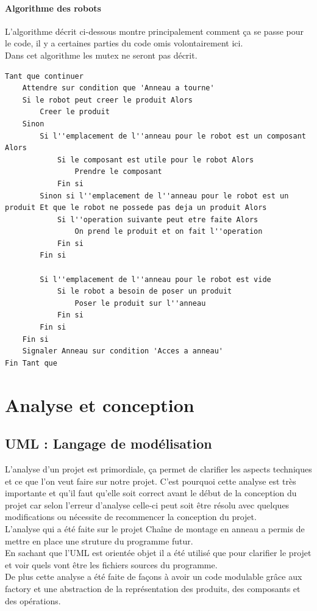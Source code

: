 \documentclass{report}
\begin{document}
\subsubsection{Algorithme des robots}
L'algorithme décrit ci-dessous montre principalement comment ça se passe pour le code, il y a certaines parties du code omis volontairement ici.\\
Dans cet algorithme les mutex ne seront pas décrit.
\begin{lstlisting}[caption=Algorithme des robots simplifié]
Tant que continuer
	Attendre sur condition que 'Anneau a tourne'
	Si le robot peut creer le produit Alors
		Creer le produit
	Sinon
		Si l''emplacement de l''anneau pour le robot est un composant Alors
			Si le composant est utile pour le robot Alors
				Prendre le composant
			Fin si
		Sinon si l''emplacement de l''anneau pour le robot est un produit Et que le robot ne possede pas deja un produit Alors
			Si l''operation suivante peut etre faite Alors
				On prend le produit et on fait l''operation
			Fin si
		Fin si

		Si l''emplacement de l''anneau pour le robot est vide
			Si le robot a besoin de poser un produit
				Poser le produit sur l''anneau
			Fin si
		Fin si
	Fin si
	Signaler Anneau sur condition 'Acces a anneau'
Fin Tant que
\end{lstlisting}

\chapter{Analyse et conception}
\section{UML : Langage de modélisation}
L'analyse d'un projet est primordiale, ça permet de clarifier les aspects techniques et ce que l'on veut faire sur notre projet. C'est pourquoi cette analyse est très importante et qu'il faut qu'elle soit correct avant le début de la conception du projet car selon l'erreur d'analyse celle-ci peut soit être résolu avec quelques modifications ou nécessite de recommencer la conception du projet.\\


L'analyse qui a été faite sur le projet Chaîne de montage en anneau a permis de mettre en place une struture du programme futur.\\
En sachant que l'UML est orientée objet il a été utilisé que pour clarifier le projet et voir quels vont être les fichiers sources du programme.\\
De plus cette analyse a été faite de façons à avoir un code modulable grâce aux factory et une abstraction de la représentation des produits, des composants et des opérations.
\newpage
\end{document}

